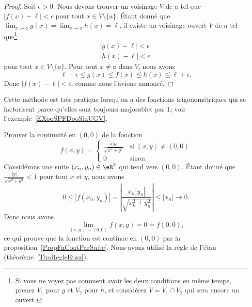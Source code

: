 \begin{proof}
	Soit \( \epsilon>0\). Nous devons trouver un voisinage \( V\) de \( a\) tel que \( | f(x)-\ell |<\epsilon\) pour tout \( x\in V\setminus\{ a \}\). Étant donné que \( \lim_{x\to a} g(x)=\lim_{x\to a} h(x)=\ell\), il existe un voisinage ouvert \( V\) de \( a\) tel que\footnote{Si vous ne voyez pas comment avoir les deux conditions en même temps, prenez \( V_1\) pour \( g\) et \( V_2\) pour \( h\), et considérez \( V=V_1\cap V_2\) qui sera encore un ouvert.}
	\begin{subequations}
		\begin{align}
			| g(x)-\ell |<\epsilon \\
			| h(x)-\ell |<\epsilon.
		\end{align}
	\end{subequations}
	pour tout \( x\in V\setminus\{ a \}\). Pour tout \( x\neq a\) dans \( V\), nous avons
	\begin{equation}
		\ell-\epsilon\leq g(x)\leq f(x)\leq h(x)\leq \ell+\epsilon.
	\end{equation}
	Donc \( | f(x)-\ell |<\epsilon\), comme nous l'avions annoncé.
\end{proof}

Cette méthode est très pratique lorsqu'on a des fonctions trigonométriques qui se factorisent parce qu'elles sont toujours majorables par \( 1\); voir l'exemple~\ref{EXooSPFDooSluUGV}.

\begin{example}
	Prouver la continuité en \( (0,0)\) de la fonction
	\begin{equation}
		f(x,y)=\begin{cases}
			\frac{ x | y | }{ \sqrt{x^2+y^2} } & \text{si }(x,y)\neq (0,0) \\
			0                                  & \text{sinon.}
		\end{cases}
	\end{equation}
	Considérons une suite \( (x_n,y_n)\in\eR^2\) qui tend vers \( (0,0)\). Étant donné que \( \frac{ | y | }{ \sqrt{x^2+y^2} }<1\) pour tout \( x\) et \( y\), nous avons
	\begin{equation}
		0\leq | f(x_n,y_n) |=\left| \frac{ x_n | y_n | }{ \sqrt{x_n^2+y_n^2} } \right| \leq | x_n |\to 0.
	\end{equation}
	Donc nous avons
	\begin{equation}
		\lim_{(x,y)\to(0,0)}f(x,y)=0=f(0,0),
	\end{equation}
	ce qui prouve que la fonction est continue en \( (0,0)\) par la proposition~\ref{PropFnContParSuite}. Nous avons utilisé la règle de l'étau (théorème~\ref{ThoRegleEtau}).
\end{example}

